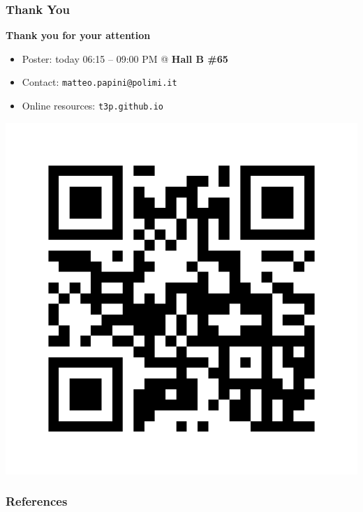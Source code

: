 \documentclass[aspectratio=169]{beamer}
\newcommand{\enb}[1]{\textcolor{poliblue1}{\textbf{#1}}}
\begin{document}
\begin{frame} 
\frametitle{Thank You} 
\begin{center}
	\Large{\enb{Thank you for your attention}}
\end{center}

\begin{minipage}[]{.6\paperwidth}
\begin{itemize}
	\item Poster: today 06:15 -- 09:00 PM @ \enb{Hall B \#65} 
	\item Contact: \texttt{matteo.papini@polimi.it}
	\item Online resources: \texttt{t3p.github.io}
	\end{itemize}
\end{minipage}
\hfill%
\begin{minipage}[]{.2\paperwidth}
\includegraphics[width=.2\paperwidth]{../qrcode.pdf}
\end{minipage}

\end{frame}


\begin{frame}
\frametitle{References}

\end{frame}
\end{document}
